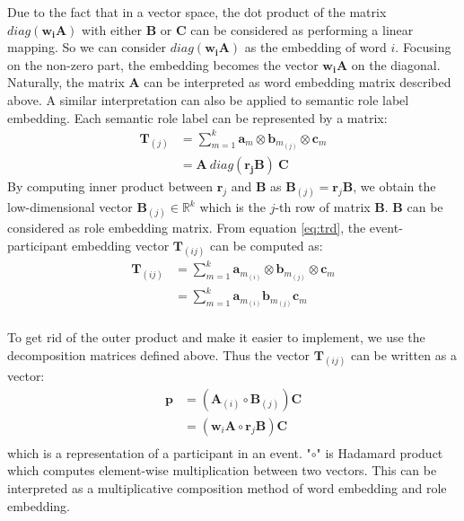 \documentclass[a4paper]{article}
\begin{document}
Due to the fact that in a vector space, the dot product of the matrix $diag(\mathbf{w_i}\mathbf{A})$ with either $\mathbf{B}$ or $\mathbf{C}$ can be considered as performing a linear mapping. So we can consider $diag(\mathbf{w_i}\mathbf{A})$ as the embedding of word $i$. Focusing on the non-zero part, the embedding becomes the vector $\mathbf{w_i}\mathbf{A}$ on the diagonal. Naturally, the matrix $\mathbf{A}$ can be interpreted as word embedding matrix described above. A similar interpretation can also be applied to semantic role label embedding. Each semantic role label can be represented by a matrix:
\begin{equation} \label{eq:re-tensor}
\begin{aligned}
    \mathbf{T}_{(j)}
        &= \sum_{m=1}^{k} \mathbf{a}_{m} \otimes \mathbf{b}_{m_{(j)}} \otimes \mathbf{c}_m \\
        &= \mathbf{A} \ diag(\mathbf{r_j}\mathbf{B}) \ \mathbf{C}
\end{aligned}
\end{equation}
By computing inner product between $\mathbf{r}_j$ and $\mathbf{B}$ as $\mathbf{B}_{(j)} = \mathbf{r}_j \mathbf{B}$, we obtain the low-dimensional vector $\mathbf{B}_{(j)} \in \mathbb{R}^k$ which is the $j$-th row of matrix $\mathbf{B}$. $\mathbf{B}$ can be considered as role embedding matrix. From equation \eqref{eq:trd}, the event-participant embedding vector $\mathbf{T}_{(ij)}$ can be computed as: 
\begin{equation} \label{eq:rbwe-tensor}
\begin{aligned}
    \mathbf{T}_{(ij)}
        &= \sum_{m=1}^{k} \mathbf{a}_{m_{(i)}} \otimes \mathbf{b}_{m_{(j)}} \otimes \mathbf{c}_m \\
        &= \sum_{m=1}^{k} \mathbf{a}_{m_{(i)}} \mathbf{b}_{m_{(j)}}  \mathbf{c}_m \\
\end{aligned}
\end{equation}

To get rid of the outer product and make it easier to implement, we use the decomposition matrices defined above. Thus the vector $\mathbf{T}_{(ij)}$ can be written as a vector: 
\begin{equation} \label{eq:rbwe}
\begin{aligned}
    \mathbf{p} 
        &= (\mathbf{A}_{(i)}\circ \mathbf{B}_{(j)}) \mathbf{C} \\
        &= (\mathbf{w}_i \mathbf{A} \circ \mathbf{r}_j \mathbf{B}) \mathbf{C} \\
\end{aligned}
\end{equation}
which is a representation of a participant in an event. "$\circ$" is Hadamard product which computes element-wise multiplication between two vectors. This can be interpreted as a multiplicative composition method of word embedding and role embedding. 
\end{document}
